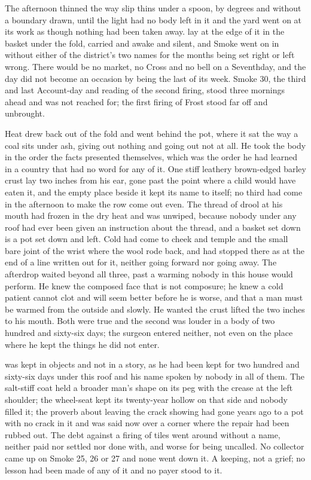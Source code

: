 The afternoon thinned the way slip thins under a spoon, by degrees and without a boundary drawn, until the light had no body left in it and the yard went on at its work as though nothing had been taken away.  lay at the edge of it in the basket under the fold, carried and awake and silent, and Smoke went on in  without either of the district's two names for the months being set right or left wrong. There would be no market, no Cross and no bell on a Seventhday, and the day did not become an occasion by being the last of its week. Smoke 30, the third and last Account-day and reading of the second firing, stood three mornings ahead and was not reached for; the first firing of Frost stood far off and unbrought.

Heat drew back out of the fold and went behind the pot, where it sat the way a coal sits under ash, giving out nothing and going out not at all. He took the body in the order the facts presented themselves, which was the order he had learned in a country that had no word for any of it. One stiff leathery brown-edged barley crust lay two inches from his ear, gone past the point where a child would have eaten it, and the empty place beside it kept its name to itself; no third had come in the afternoon to make the row come out even. The thread of drool at his mouth had frozen in the dry heat and was unwiped, because nobody under any roof had ever been given an instruction about the thread, and a basket set down is a pot set down and left. Cold had come to cheek and temple and the small bare joint of the wrist where the wool rode back, and had stopped there as at the end of a line written out for it, neither going forward nor going away. The afterdrop waited beyond all three, past a warming nobody in this house would perform. He knew the composed face that is not composure; he knew a cold patient cannot clot and will seem better before he is worse, and that a man must be warmed from the outside and slowly. He wanted the crust lifted the two inches to his mouth. Both were true and the second was louder in a body of two hundred and sixty-six days; the surgeon entered neither, not even on the place where he kept the things he did not enter.

 was kept in objects and not in a story, as he had been kept for two hundred and sixty-six days under this roof and his name spoken by nobody in all of them. The salt-stiff coat held a broader man's shape on its peg with the crease at the left shoulder; the wheel-seat kept its twenty-year hollow on that side and nobody filled it; the proverb about leaving the crack showing had gone years ago to a pot with no crack in it and was said now over a corner where the repair had been rubbed out. The debt against a firing of tiles went around without a name, neither paid nor settled nor done with, and worse for being uncalled. No collector came up  on Smoke 25, 26 or 27 and none went down it. A keeping, not a grief; no lesson had been made of any of it and no payer stood to it.


